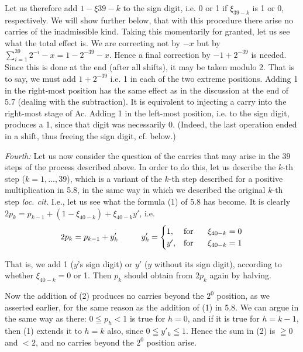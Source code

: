 \documentclass[12pt]{amsart}
\begin{document}
Let us therefore add $1 - \xi{39 - k}$ to the sign digit, i.e. 0 or 1 if $\xi_{39 - k}$ is 1 or 0, respectively. We will show further below, that with this procedure there arise no carries of the inadmissible kind. Taking this momentarily for granted, let us see what the total effect is. We are correcting not by $-x$ but by $\sum_{i=1}^{39} 2^{-i} - x = 1 - 2^{-39} - x$. Hence a final correction by $-1 + 2^{-39}$ is needed. Since this is done at the end (after all shifts), it may be taken modulo 2. That is to say, we must add $1 + 2^{-39}$ i.e. 1 in each of the two extreme positions. Adding 1 in the right-most position has the same effect as in the discussion at the end of 5.7 (dealing with the subtraction). It is equivalent to injecting a carry into the right-most stage of Ac. Adding 1 in the left-most position, i.e. to the sign digit, produces a 1, since that digit was necessarily 0. (Indeed, the last operation ended in a shift, thus freeing the sign digit, cf. below.)

\emph{Fourth:} Let us now consider the question of the carries that may arise in the 39 steps of the process described above. In order to do this, let us describe the $k$-th step ($k = 1, ... , 39$), which is a variant of the $k$-th step described for a positive multiplication in 5.8, in the same way in which we described the original $k$-th step \emph{loc. cit.} I.e., let us see what the formula (1) of 5.8 has become. It is clearly $2p_k = p_{k - 1} + (1 - \xi_{40 - k}) + \xi_{40 - k}y'$, i.e.
\begin{equation}
2p_k = p_{k-1} + y'_k \hspace{10 mm} y'_k =
\begin{cases}
1,& \text{for } \hspace{5 mm} \xi_{40 - k} = 0\\
y',& \text{for } \hspace{5 mm} \xi_{40 - k} = 1
\end{cases}
\end{equation}

That is, we add 1 ($y$'s sign digit) or $y'$ ($y$ without its sign digit), according to whether $\xi_{40 - k} = 0$ or 1. Then $p_k$ should obtain from $2p_k$ again by halving.

Now the addition of (2) produces no carries beyond the $2^0$ position, as we asserted earlier, for the same reason as the addition of (1) in 5.8. We can argue in the same way as there: $0 \leqq p_h < 1$ is true for $h = 0$, and if it is true for $h = k - 1$, then (1) extends it to $h = k$ also, since $0 \leqq y'_k \leqq 1$. Hence the sum in (2) is $\geqq 0$ and $< 2$, and no carries beyond the $2^0$ position arise.
\end{document}
